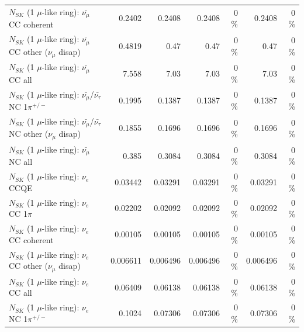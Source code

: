 \begin{table}
\begin{tabular}{| l | r | r | r  r | r  r |}
                       $N_{SK}$ (1 $\mu$-like ring): $\bar{\nu_\mu}$ CC coherent &          0.2402 &          0.2408 &          0.2408 &        0 \%  &          0.2408 &        0 \%  \\ 
        $N_{SK}$ (1 $\mu$-like ring): $\bar{\nu_\mu}$ CC other ($\nu_\mu$ disap) &          0.4819 &            0.47 &            0.47 &        0 \%  &            0.47 &        0 \%  \\ 
                          $N_{SK}$ (1 $\mu$-like ring): $\bar{\nu_{\mu}}$ CC all &           7.558 &            7.03 &            7.03 &        0 \%  &            7.03 &        0 \%  \\ 
\hline
  $N_{SK}$ (1 $\mu$-like ring): $\bar{\nu_\mu}$/$\bar{\nu_\tau}$ NC 1$\pi^{+/-}$ &          0.1995 &          0.1387 &          0.1387 &        0 \%  &          0.1387 &        0 \%  \\ 
$N_{SK}$ (1 $\mu$-like ring): $\bar{\nu_\mu}$/$\bar{\nu_\tau}$ NC other ($\nu_\mu$ disap) &          0.1855 &          0.1696 &          0.1696 &        0 \%  &          0.1696 &        0 \%  \\ 
                          $N_{SK}$ (1 $\mu$-like ring): $\bar{\nu_{\mu}}$ NC all &           0.385 &          0.3084 &          0.3084 &        0 \%  &          0.3084 &        0 \%  \\ 
\hline
\hline
\hline
                                      $N_{SK}$ (1 $\mu$-like ring): $\nu_e$ CCQE &         0.03442 &         0.03291 &         0.03291 &        0 \%  &         0.03291 &        0 \%  \\ 
                                 $N_{SK}$ (1 $\mu$-like ring): $\nu_e$ CC 1$\pi$ &         0.02202 &         0.02092 &         0.02092 &        0 \%  &         0.02092 &        0 \%  \\ 
                               $N_{SK}$ (1 $\mu$-like ring): $\nu_e$ CC coherent &         0.00105 &         0.00105 &         0.00105 &        0 \%  &         0.00105 &        0 \%  \\ 
                $N_{SK}$ (1 $\mu$-like ring): $\nu_e$ CC other ($\nu_\mu$ disap) &        0.006611 &        0.006496 &        0.006496 &        0 \%  &        0.006496 &        0 \%  \\ 
                                  $N_{SK}$ (1 $\mu$-like ring): $\nu_{e}$ CC all &         0.06409 &         0.06138 &         0.06138 &        0 \%  &         0.06138 &        0 \%  \\ 
\hline
                           $N_{SK}$ (1 $\mu$-like ring): $\nu_e$ NC 1$\pi^{+/-}$ &          0.1024 &         0.07306 &         0.07306 &        0 \%  &         0.07306 &        0 \%  \\ 

\end{tabular}
\end{table}
